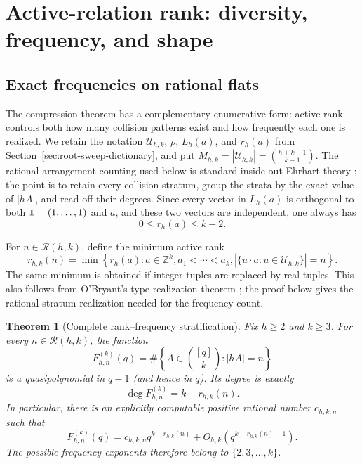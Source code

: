 \documentclass[11pt,reqno]{amsart}
\newtheorem{theorem}{Theorem}[section]
\theoremstyle{definition}
\theoremstyle{remark}
\begin{document}
\section{Active-relation rank: diversity, frequency, and shape}
\label{sec:rank-duality}

\subsection{Exact frequencies on rational flats}

The compression theorem has a complementary enumerative form: active rank
controls both how many collision patterns exist and how frequently each one
is realized.  We retain the notation $\mathcal U_{h,k}$, $\rho$, $L_h(a)$,
and $r_h(a)$ from Section~\ref{sec:root-sweep-dictionary}, and put
$M_{h,k}=|\mathcal U_{h,k}|=\binom{h+k-1}{k-1}$.  The rational-arrangement
counting used below is standard inside-out Ehrhart theory
\cite{BeckZaslavsky2006,BeckBogartPham2012,BogartCuellar2025}; the point is
to retain every collision stratum, group the strata by the exact value of
$|hA|$, and read off their degrees.  Since every vector in $L_h(a)$ is
orthogonal to both ${\bf 1}=(1,\ldots,1)$ and $a$, and these two vectors
are independent, one always has
\begin{equation}\label{eq:rank-frequency-range}
 0\leq r_h(a)\leq k-2.
\end{equation}

For $n\in\mathcal R(h,k)$, define the minimum active rank
\begin{equation}\label{eq:minimum-active-rank}
 r_{h,k}(n)=\min\left\{r_h(a):a\in\mathbb Z^k,
           a_1<\cdots<a_k,
          \left|\{u\cdot a:u\in\mathcal U_{h,k}\}\right|=n\right\}.
\end{equation}
The same minimum is obtained if integer tuples are replaced by real tuples.  This
also follows from O'Bryant's type-realization theorem
\cite[Theorem~7]{OBryant2025}; the proof below gives the rational-stratum
realization needed for the frequency count.

\begin{theorem}[Complete rank--frequency stratification]
\label{thm:rank-frequency}
Fix $h\geq2$ and $k\geq3$.  For every $n\in\mathcal R(h,k)$, the function
\[
 F^{(k)}_{h,n}(q)=
 \#\left\{A\in\binom{[q]}k:|hA|=n\right\}
\]
is a quasipolynomial in $q-1$ (and hence in $q$).  Its degree is exactly
\[
 \deg F^{(k)}_{h,n}=k-r_{h,k}(n).
\]
In particular, there is an explicitly computable positive rational number
$c_{h,k,n}$ such that
\begin{equation}\label{eq:rank-frequency-asymptotic}
 F^{(k)}_{h,n}(q)
 =c_{h,k,n}q^{k-r_{h,k}(n)}
  +O_{h,k}\!\left(q^{k-r_{h,k}(n)-1}\right).
\end{equation}
The possible frequency exponents therefore belong to
$\{2,3,\ldots,k\}$.
\end{theorem}
\end{document}
